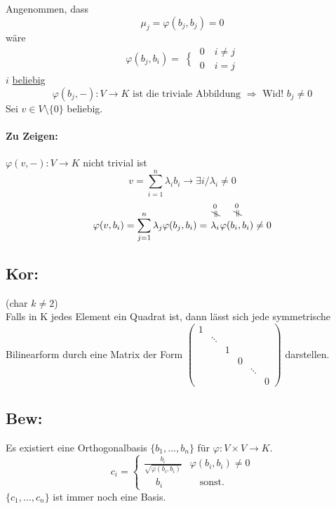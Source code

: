 \documentclass[titlepage,12pt,a4paper,ngerman]{report}
\newcommand{\tx}[1]{\textrm{#1}}
\newcommand{\summ}[2]{\sum_{#1}^{#2}}
\newcommand{\casess}[4]{\left\{ \begin{array}{ll} {#1} & {#2} \\ {#3} & {#4} \end{array} \right.}
\begin{document}
\boxed{\Rightarrow} Angenommen, dass 
$$\mu_j = \varphi(b_j,b_j) = 0$$
wäre
$$\left. \varphi(b_j,b_i) = \right \{ \begin{array}{ll}
0 \quad i \neq j\\
0 \quad i   =  j
\end{array}$$
$i$ \underline{beliebig}
$$\varphi(b_j,-):V \to K \tx{ ist die triviale Abbildung } \Rightarrow \tx{ Wid! } b_j \neq 0$$
\boxed{\Leftarrow} Sei $v \in V\setminus \{0\}$ beliebig.
\paragraph{Zu Zeigen:} $\varphi (v,-): V \to K$ nicht trivial ist
$$v = \summ{i=1}{n} \lambda_i b_i \rightarrow \exists i / \lambda_i \neq 0$$
$$\varphi(v,b_i) = \summ{j=1}{n} \lambda_j \varphi (b_j, b_i) = \overset{\scriptstyle\underset{\mkern4mu\rotatebox{90}{$\,\neq$}}{0}}{\lambda_i} \overset{\scriptstyle\underset{\mkern4mu\rotatebox{90}{$\,\neq$}}{0}}{\varphi(b_i,b_i)} \neq 0$$


\subsection{Kor:}
(char $ k \neq 2 $)\\
Falls in K jedes Element ein Quadrat ist, dann lässt sich jede symmetrische Bilinearform durch eine Matrix der Form
$ \begin{pmatrix}
1 \\
& \ddots \\
& & 1 \\
& & & 0 \\
& & & & \ddots \\
& & & & & 0
\end{pmatrix} $ darstellen.

\subsection{Bew:}
Es existiert eine Orthogonalbasis  $ \{b_1,\dots , b_n\} $ für $ \varphi:V \times V \to K $.
$$c_i = \casess{\frac{b_i}{\sqrt{\varphi(b_i,b_i)}}}{\varphi(b_i,b_i) \neq 0}{\quad \ b_i}{\quad \tx{sonst.}}$$
$ \{c_1,\dots , c_n \} $ ist immer noch eine Basis.\\
\end{document}

